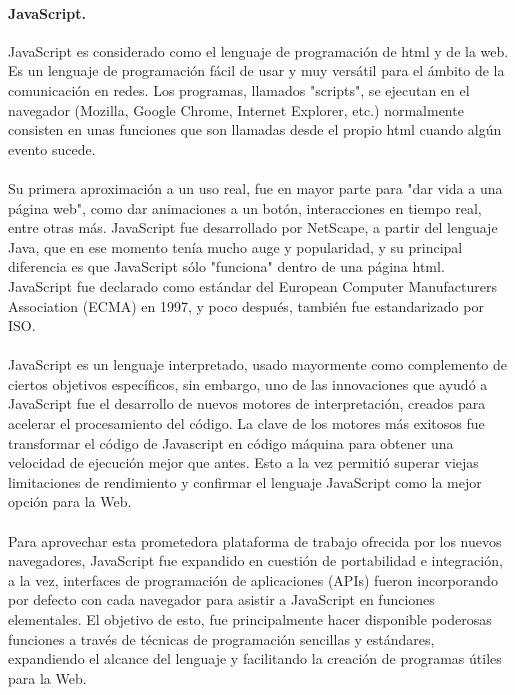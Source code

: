 \documentclass[12pt, a4paper, titlepage]{report}
\begin{document}
			\paragraph {JavaScript. \\}
			JavaScript es considerado como el lenguaje de programación de html y de la web. Es un lenguaje de programación fácil de usar y muy versátil para el ámbito de la comunicación en redes. Los programas, llamados "scripts", se ejecutan en el navegador (Mozilla, Google Chrome, Internet Explorer, etc.) normalmente consisten en unas funciones que son llamadas desde el propio html cuando algún evento sucede.\\\\
			Su primera aproximación a un uso real, fue en mayor parte para "dar vida a una página web", como dar animaciones a un botón, interacciones en tiempo real, entre otras más. 
			JavaScript fue desarrollado por \Gls{NetScape}, a partir del lenguaje Java, que en ese momento tenía mucho auge y popularidad, y su principal diferencia es que JavaScript sólo "funciona" dentro de una página html.\\
			JavaScript fue declarado como estándar del European Computer Manufacturers Association (ECMA) en 1997, y poco después, también fue estandarizado por ISO.\cite{refJavaScript} \\\\ 
			JavaScript es un lenguaje interpretado, usado mayormente como complemento de ciertos objetivos específicos, sin embargo, uno de las innovaciones que ayudó a JavaScript fue el desarrollo de nuevos motores de interpretación, creados para acelerar el procesamiento del código. La clave de los motores más exitosos fue transformar el código de Javascript en código máquina para obtener una velocidad de ejecución mejor que antes. Esto a la vez permitió superar viejas limitaciones de rendimiento y confirmar el lenguaje JavaScript como la mejor opción para la Web.\\\\
			
			Para aprovechar esta prometedora plataforma de trabajo ofrecida por los nuevos navegadores, JavaScript fue expandido en cuestión de portabilidad e integración, a la vez, interfaces de programación de aplicaciones (APIs) fueron incorporando por defecto con cada navegador para asistir a JavaScript en funciones elementales. El objetivo de esto, fue principalmente hacer disponible poderosas funciones a través de técnicas de programación sencillas y estándares, expandiendo el alcance del lenguaje y facilitando la creación de programas útiles para la Web.\cite{refElGranLibro}
			
\end{document}
